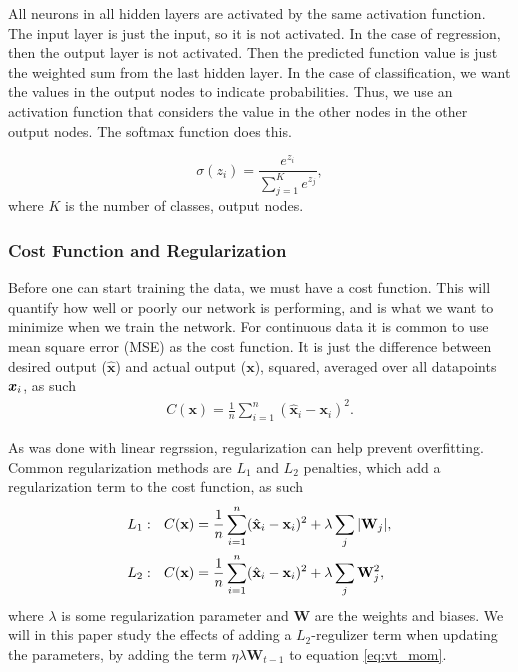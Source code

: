 \documentclass[12pt]{extarticle}
\begin{document}
All neurons in all hidden layers are activated by the same activation function. The input layer is just the input, so it is not activated. In the case of regression, then the output layer is not activated. Then the predicted function value is just the weighted sum from the last hidden layer. In the case of classification, we want the values in the output nodes to indicate probabilities. Thus, we use an activation function that considers the value in the other nodes in the other output nodes. The softmax function does this.

\begin{equation*}
	\sigma(z_i) = \frac{e^{z_i}}{\sum_{j=1}^Ke^{z_j}},
\end{equation*}
where $K$ is the number of classes, output nodes.

\subsubsection{Cost Function and Regularization}\label{sec:cost_func_and_regul}
Before one can start training the data, we must have a cost function. This will quantify how well or poorly our network is performing, and is what we want to minimize when we train the network. For continuous data it is common to use mean square error (MSE) as the cost function. It is just the difference between desired output ($\hat{\mathbf{x}}$) and actual output ($\mathbf{x}$), squared, averaged over all datapoints $\boldsymbol x_i$, as such
\begin{align}
	C(\mathbf{x}) = \frac{1}{n}\sum_{i=1}^{n}(\hat{\mathbf{x}}_i - \mathbf{x}_i)^2.
	\label{eq:MSE}
\end{align}

As was done with linear regrssion, \cite{project1} regularization can help prevent overfitting. Common regularization methods are $L_1$ and $L_2$ penalties, which add a regularization term to the cost function, as such
\begin{align}
	L_1: \ \ C(\mathbf{x}) & = \frac{1}{n}\sum_{i=1}^{n}(\hat{\mathbf{x}}_i - \mathbf{x}_i)^2 + \lambda\sum_j \abs{\mathbf{W}_j}, \label{eq:L1} \\
	L_2: \ \ C(\mathbf{x}) & = \frac{1}{n}\sum_{i=1}^{n}(\hat{\mathbf{x}}_i - \mathbf{x}_i)^2 + \lambda\sum_j \mathbf{W}^2_j, \label{eq:L2}
\end{align}
where $\lambda$ is some regularization parameter and $\mathbf{W}$ are the weights and biases. We will in this paper study the effects of adding a $L_2$-regulizer term when updating the parameters, by adding the term $\eta \lambda \mathbf{W}_{t-1}$ to equation \eqref{eq:vt_mom}.
\end{document}
